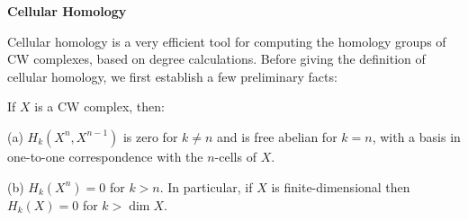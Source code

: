 \textbf{Cellular Homology}

Cellular homology is a very efficient tool for computing the homology groups of CW complexes, based on degree calculations. Before giving the definition of cellular homology, we first establish a few preliminary facts:

\begin{lemma}
\label{lem:homology-cw-skeleton-pairs}
If $X$ is a CW complex, then:
\end{lemma}

(a) $H_k(X^n, X^{n-1})$ is zero for $k \ne n$ and is free abelian for $k = n$, with a basis in one-to-one correspondence with the $n$-cells of $X$.

(b) $H_k(X^n) = 0$ for $k > n$. In particular, if $X$ is finite-dimensional then $H_k(X) = 0$ for $k > \dim X$.

